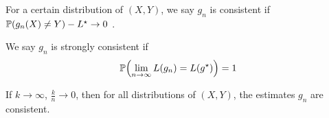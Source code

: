 \begin{defn}
  \label{defn:nearest_neighbour_classification:2}
  For a certain distribution of $(X, Y)$, we say $g_{n}$ is consistent
  if $\Prob{g_{n}(X) \neq Y} - L^{\star} \rightarrow 0$ .

  We say $g_{n}$ is strongly consistent if
  \begin{equation}
    \label{eq:97}
    \Prob{\lim_{n \rightarrow \infty} L(g_{n}) = L(g^{\star})} = 1
  \end{equation}
\end{defn}

\begin{thm}
  \label{defn:nearest_neighbour_classification:3}
  If $k \rightarrow \infty$, $\frac{k}{n} \rightarrow 0$, then for all
  distributions of $(X, Y)$, the \knn estimates $g_{n}$ are consistent.
\end{thm}

